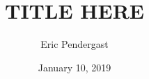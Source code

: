 \documentclass[12pt]{article}
\begin{document}
\title{TITLE HERE}
\date{January 10, 2019}
\author{Eric Pendergast}
\maketitle
\end{document}
